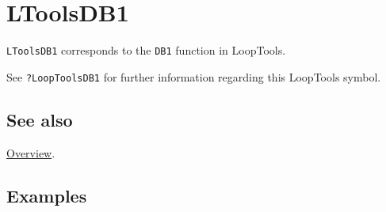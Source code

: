 \documentclass[../FeynHelpersManual.tex]{subfiles}
\begin{document}
\hypertarget{ltoolsdb1}{
\section{LToolsDB1}\label{ltoolsdb1}}

\texttt{LToolsDB1} corresponds to the \texttt{DB1} function in
LoopTools.

See \texttt{?LoopTools\textasciigrave DB1} for further information
regarding this LoopTools symbol.

\subsection{See also}

\hyperlink{toc}{Overview}.

\subsection{Examples}
\end{document}
